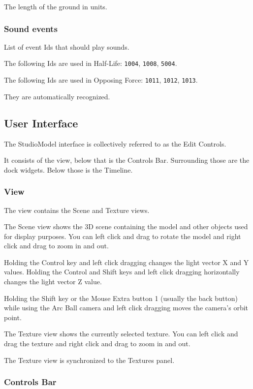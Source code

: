 \documentclass[10pt, a4paper, titlepage, oneside]{article}
\newcommand{\code}[1]{\mbox{\texttt{#1}}}
\begin{document}
The length of the ground in units.

\subsubsection{Sound events}

List of event Ids that should play sounds.

The following Ids are used in Half-Life: \code{1004}, \code{1008}, \code{5004}.

The following Ids are used in Opposing Force: \code{1011}, \code{1012}, \code{1013}.

They are automatically recognized.

\newpage

\subsection{User Interface}

The StudioModel interface is collectively referred to as the Edit Controls.

It consists of the view, below that is the Controls Bar. Surrounding those are the dock widgets. Below those is the Timeline.

\subsubsection{View}

The view contains the Scene and Texture views.

The Scene view shows the 3D scene containing the model and other objects used for display purposes. You can left click and drag to rotate the model and right click and drag to zoom in and out.

Holding the Control key and left click dragging changes the light vector X and Y values. Holding the Control and Shift keys and left click dragging horizontally changes the light vector Z value.

Holding the Shift key or the Mouse Extra button 1 (usually the back button) while using the Arc Ball camera and left click dragging moves the camera's orbit point.

The Texture view shows the currently selected texture. You can left click and drag the texture and right click and drag to zoom in and out.

The Texture view is synchronized to the Textures panel.

\subsubsection{Controls Bar}
\end{document}
